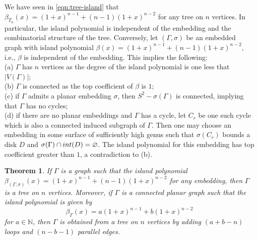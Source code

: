 \documentclass[10pt, reqno]{amsart}
\newcommand{\bgd}{\begin{displaymath}}
\newcommand{\edd}{\end{displaymath}}
\newcommand{\hf}{\hspace*{0.5cm}}
\theoremstyle{plain}
\newtheorem{theorem}{Theorem}[section]
\theoremstyle{remark}
\theoremstyle{definition}
\numberwithin{equation}{section}
\begin{document}
\hf We have seen in \eqref{eqn:tree-island} that 
$\beta_{T_n}(x)=(1+x)^{n-1}+(n-1)(1+x)^{n-2}$
for any tree on $n$ vertices. In particular, the island polynomial is independent of the embedding and the combinatorial structure of the tree. Conversely, let $(\Gamma,\sigma)$ be an embedded graph with island polynomial $\beta(x)=(1+x)^{n-1}+(n-1)(1+x)^{n-2}$, i.e., $\beta$ is independent of the embedding. This implies the following:\\
\hf (a) $\Gamma$ has $n$ vertices as the degree of the island polynomial is one less that $|V(\Gamma)|$;\\
\hf (b) $\Gamma$ is connected as the top coefficient of $\beta$ is $1$;\\
\hf (c) if $\Gamma$ admits a planar embedding $\sigma$, then $S^2-\sigma(\Gamma)$ is connected, implying that $\Gamma$ has no cycles; \\
\hf (d) if there are no planar embeddings and $\Gamma$ has a cycle, let $C_r$ be one such cycle which is also a connected induced subgraph of $\Gamma$. Then one may choose an embedding in some surface of sufficiently high genus such that $\sigma(C_r)$ bounds a disk $D$ and $\sigma(\Gamma)\cap \textup{int}(D)=\varnothing$. The island polynomial for this embedding has top coefficient greater than $1$, a contradiction to (b).
\begin{theorem}\label{thm:tree-detection}
If $\Gamma$ is a graph such that the island polynomial $\beta_{(\Gamma,\sigma)}(x)=(1+x)^{n-1}+(n-1)(1+x)^{n-2}$ for any embedding, then $\Gamma$ is a tree on $n$ vertices. Moreover, if $\Gamma$ is a connected planar graph such that the island polynomial is given by
\bgd
{\beta}_{\Gamma}(x)=a(1+x)^{n-1}+b(1+x)^{n-2}
\edd
for $a\in \mathbb{N}$, then $\Gamma$ is obtained from a tree on $n$ vertices by adding $(a+b-n)$ loops and $(n-b-1)$ parallel edges. 
\end{theorem}
\end{document}
